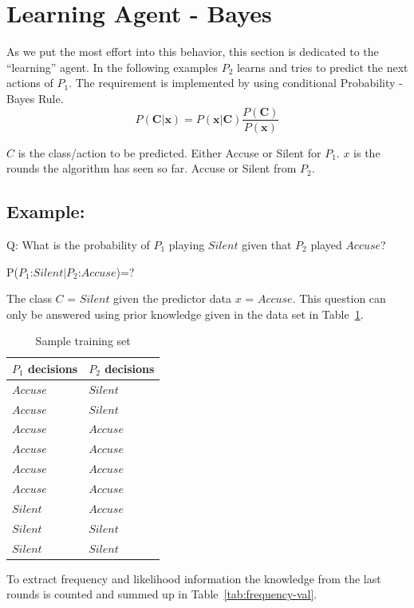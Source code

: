 \documentclass{acm_proc_article-sp}
\begin{document}
\section{Learning Agent - Bayes}
As we put the most effort into this behavior, this section is dedicated to the ``learning'' agent.
In the following examples $P_2$ learns and tries to predict the next actions of $P_1$. The requirement is implemented by using conditional Probability - Bayes Rule.
\[
    P(\textbf{C}|\textbf{x}) = P(\textbf{x}|\textbf{C}) \frac{P(\textbf{C})}{P(\textbf{x})}
\]

$C$ is the class/action to be predicted. Either Accuse or Silent for $P_1$.
$x$ is the rounds the algorithm has seen so far. Accuse or Silent from $P_2$.


\subsection{Example:}
Q: What is the probability of $P_1$ playing $Silent$ given that $P_2$ played $Accuse$? 
\begin{center} 
P($P_1$:$Silent$$|$$P_2$:$Accuse$)=?
\end{center}

The class $C$ = $Silent$ given the predictor data $x$ = $Accuse$. 
This question can only be answered using prior knowledge given in the data set in Table~\ref{tab:training-set}.

\begin{table}
\centering
\begin{tabular}{l | l }
 $P_1$ decisions & $P_2$ decisions \\
  \hline
$Accuse$&$Silent$\\
  \hline
$Accuse$&$Silent$\\
  \hline
$Accuse$&$Accuse$\\
  \hline
$Accuse$&$Accuse$\\
  \hline
$Accuse$&$Accuse$\\
  \hline
$Accuse$&$Accuse$\\
\hline
$Silent$&$Accuse$\\
\hline
$Silent$&$Silent$\\
\hline
$Silent$&$Silent$\\
\end{tabular}
\caption{Sample training set}
\label{tab:training-set}
\end{table}

To extract frequency and likelihood information the knowledge from the
last rounds is counted and summed up in Table~\ref{tab:frequency-val}.
\end{document}
